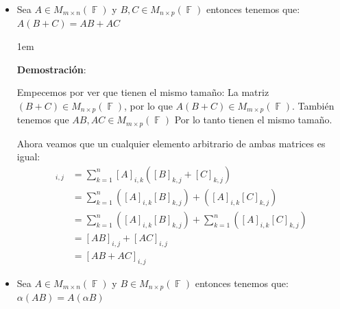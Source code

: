\documentclass[12pt, fleqn]{report}                             %
\newenvironment{SmallIndentation}[1][0.75em]                    %
        {\begin{adjustwidth}{#1}{}\begin{footnotesize}}             %
        {\end{footnotesize}\end{adjustwidth}}                       %
\theoremstyle{break}                                            %
\DeclareMathOperator \GenericField {\mathbb{F}}                 %
\begin{document}
                \begin{itemize}

                    \item
                        Sea $A \in M_{m \times n}(\GenericField)$ y $B,C \in M_{n \times p}(\GenericField)$
                        entonces tenemos que:
                        $A(B+C) = AB+AC$

                        \begin{SmallIndentation}[1em]
                            \textbf{Demostración}:

                            Empecemos por ver que tienen el mismo tamaño:
                            La matriz $(B+C) \in M_{n \times p}(\GenericField)$, por lo que 
                            $A(B+C) \in M_{m \times p}(\GenericField)$.
                            También tenemos que $AB, AC \in M_{m \times p}(\GenericField)$
                            Por lo tanto tienen el mismo tamaño.

                            Ahora veamos que un cualquier elemento arbitrario de ambas matrices es igual:
                            \begin{align*}
                                [ A (B + C) ]_{i, j}    
                                    &= \sum_{k = 1}^n  [A]_{i, k} ([B]_{k, j} + [C]_{k, j})                 \\
                                    &= \sum_{k = 1}^n ([A]_{i, k} [B]_{k, j}) + ([A]_{i, k} [C]_{k, j})     \\
                                    &= \sum_{k = 1}^n ([A]_{i, k} [B]_{k, j}) 
                                        +
                                       \sum_{k = 1}^n ([A]_{i, k} [C]_{k, j})                               \\
                                    &= [AB]_{i, j} + [AC]_{i, j}                                            \\
                                    &= [AB + AC]_{i, j}
                            \end{align*}

                        \end{SmallIndentation}

                    \item
                        Sea $A \in M_{m \times n}(\GenericField)$ y $B \in M_{n \times p}(\GenericField)$
                        entonces tenemos que: $\alpha(AB) = A(\alpha B)$


\end{itemize}
\end{document}
